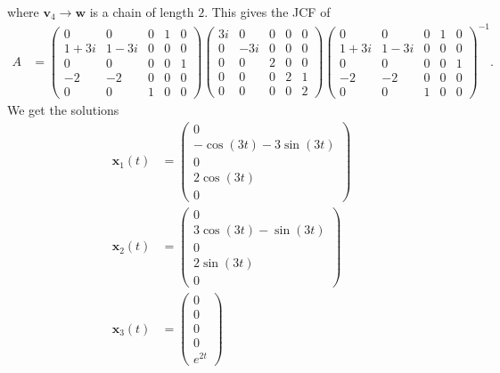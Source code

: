 \documentclass[10pt]{mypackage}
\begin{document}
\begin{example}
\begin{align*}
  \end{align*}
  where $\mathbf{v}_4\rightarrow \mathbf{w}$ is a chain of length $2$. This gives the JCF of
  \begin{align*}
    A &= \begin{pmatrix}0 & 0 & 0 & 1 & 0 \\ 1+3i & 1-3i & 0 & 0 & 0 \\ 0 & 0 & 0 & 0 & 1 \\ -2 & -2 & 0 & 0 & 0 \\ 0 & 0 & 1 & 0 & 0\end{pmatrix} \begin{pmatrix}3i & 0 & 0 & 0 & 0 \\ 0 & -3i & 0 & 0 & 0 \\ 0 & 0 & 2 & 0 & 0 \\ 0 & 0 & 0 & 2 & 1 \\ 0 & 0 & 0 & 0 & 2\end{pmatrix} \begin{pmatrix}0 & 0 & 0 & 1 & 0 \\ 1+3i & 1-3i & 0 & 0 & 0 \\ 0 & 0 & 0 & 0 & 1 \\ -2 & -2 & 0 & 0 & 0 \\ 0 & 0 & 1 & 0 & 0\end{pmatrix}^{-1}.
  \end{align*}
  We get the solutions
  \begin{align*}
    \mathbf{x}_1(t) &= \begin{pmatrix}0 \\ -\cos\left( 3t \right) - 3\sin\left( 3t \right)\\0\\2\cos\left( 3t \right)\\0\end{pmatrix}\\
    \mathbf{x}_2(t) &= \begin{pmatrix}0\\3\cos\left( 3t \right)-\sin\left( 3t \right) \\ 0 \\ 2\sin\left( 3t \right)\\0\end{pmatrix}\\
    \mathbf{x}_3(t) &= \begin{pmatrix}0\\0\\0\\0\\e^{2t}\end{pmatrix}\\

\end{align*}
\end{example}
\end{document}
